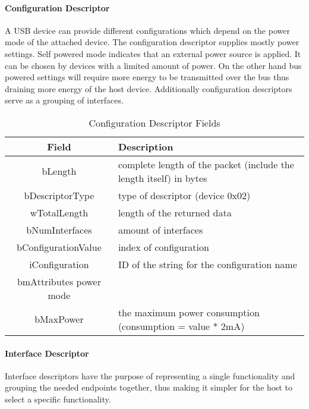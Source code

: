 \paragraph{Configuration Descriptor}
A USB device can provide different configurations which depend on the power mode of the attached device. The configuration descriptor supplies mostly 
power settings. Self powered mode indicates that an external power source is applied. It can be chosen by devices with a limited amount of power. On 
the other hand bus powered settings will require more energy to be transmitted over the bus thus draining more energy of the host device. Additionally 
configuration descriptors serve as a grouping of interfaces.%
\begin{table}[h!]
\begin{tabular}{c|p{10 cm}} 
Field & Description \\ \hline
bLength & complete length of the packet (include the length itself) in bytes \\
bDescriptorType & type of descriptor (device 0x02)\\
wTotalLength & length of the returned data \\
bNumInterfaces & amount of interfaces\\
bConfigurationValue & index of configuration \\
iConfiguration & ID of the string for the configuration name\\
bmAttributes  power mode\\
bMaxPower & the maximum power consumption (consumption = value * 2mA) \\
\end{tabular}
 \caption{Configuration Descriptor Fields}
\end{table}


\paragraph{Interface Descriptor}
Interface descriptors have the purpose of representing a single functionality and grouping the needed endpoints together, thus making 
it simpler for the host to select a specific functionality.%

